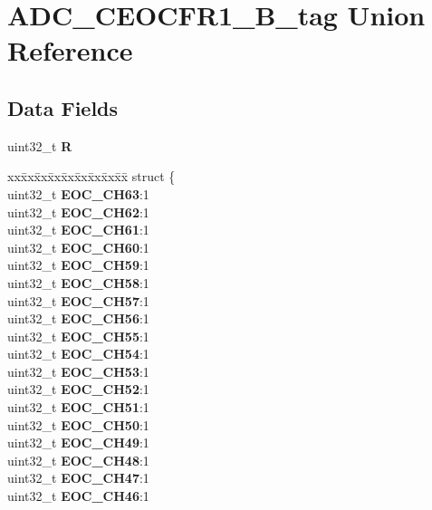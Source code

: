 \hypertarget{unionADC__CEOCFR1__32B__tag}{}\section{A\+D\+C\+\_\+\+C\+E\+O\+C\+F\+R1\+\_\+B\+\_\+tag Union Reference}
\label{unionADC__CEOCFR1__32B__tag}
\subsection*{Data Fields}
\begin{DoxyCompactItemize}
\item 
\mbox{\label{unionADC__CEOCFR1__32B__tag_aefebf07f2d177f6b5995abe15773d178}} 
uint32\+\_\+t {\bfseries R}
\item 
\mbox{\label{unionADC__CEOCFR1__32B__tag_ae555788b2e1f311f6a8a10e18ca25a9b}} 
\begin{tabbing}
xx\=xx\=xx\=xx\=xx\=xx\=xx\=xx\=xx\=\kill
struct \{\\
\>uint32\_t {\bfseries EOC\_CH63}:1\\
\>uint32\_t {\bfseries EOC\_CH62}:1\\
\>uint32\_t {\bfseries EOC\_CH61}:1\\
\>uint32\_t {\bfseries EOC\_CH60}:1\\
\>uint32\_t {\bfseries EOC\_CH59}:1\\
\>uint32\_t {\bfseries EOC\_CH58}:1\\
\>uint32\_t {\bfseries EOC\_CH57}:1\\
\>uint32\_t {\bfseries EOC\_CH56}:1\\
\>uint32\_t {\bfseries EOC\_CH55}:1\\
\>uint32\_t {\bfseries EOC\_CH54}:1\\
\>uint32\_t {\bfseries EOC\_CH53}:1\\
\>uint32\_t {\bfseries EOC\_CH52}:1\\
\>uint32\_t {\bfseries EOC\_CH51}:1\\
\>uint32\_t {\bfseries EOC\_CH50}:1\\
\>uint32\_t {\bfseries EOC\_CH49}:1\\
\>uint32\_t {\bfseries EOC\_CH48}:1\\
\>uint32\_t {\bfseries EOC\_CH47}:1\\
\>uint32\_t {\bfseries EOC\_CH46}:1\\

\end{tabbing}
\end{DoxyCompactItemize}

